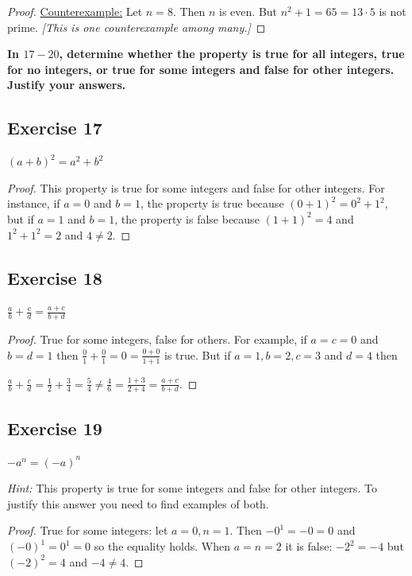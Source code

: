 \documentclass[14pt]{extarticle}
\newcommand{\dps}{\displaystyle}
\newcommand{\cy}{\color{cyan}}
\begin{document}
\begin{proof}
\underline{Counterexample:} Let $n = 8$. Then $n$ is even. But $n^2 + 1 = 65 = 13 \cdot 5$ is not prime. {\it [This is one counterexample among many.]}
\end{proof}

{\bf \cy In $17-20$, determine whether the property is true for all integers, true for no integers, or true for some integers and false for other integers. Justify your answers.}

\subsection{Exercise 17}
$(a+b)^2 = a^2 + b^2$

\begin{proof}
This property is true for some integers and false for other integers. For instance, if $a = 0$ and $b = 1$, the property is true because $(0 + 1)^2 = 0^2 + 1^2$, but if $a = 1$ and $b = 1$, the property is false because $(1 + 1)^2 = 4$ and $1^2 + 1^2 = 2$ and $4 \neq 2$.
\end{proof}

\subsection{Exercise 18}
$\dps \frac{a}{b} + \frac{c}{d} = \frac{a+c}{b+d}$

\begin{proof}
True for some integers, false for others. For example, if $a = c = 0$ and $b = d = 1$ then $\dps \frac{0}{1} + \frac{0}{1} = 0 = \frac{0+0}{1+1}$ is true. But if $a = 1, b = 2, c = 3$ and $d = 4$ then 

$\dps \frac{a}{b} + \frac{c}{d} = \frac{1}{2} + \frac{3}{4} = \frac{5}{4} \neq \frac{4}{6} = \frac{1+3}{2+4} = \frac{a+c}{b+d}$.
\end{proof}

\subsection{Exercise 19}
$-a^n = (-a)^n$

{\it Hint:} This property is true for some integers and false for other integers. To justify this answer you need to find examples of both.

\begin{proof}
True for some integers: let $a = 0, n = 1$. Then $-0^1 = -0 = 0$ and $(-0)^1 = 0^1 = 0$ so the equality holds. When $a = n = 2$ it is false: $-2^2 = -4$ but $(-2)^2 = 4$ and $-4 \neq 4$.
\end{proof}
\end{document}
